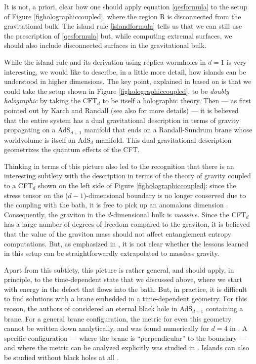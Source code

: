 \documentclass[12pt]{article}
\begin{document}
It is not, a priori, clear how one should apply equation \eqref{qesformula} to the setup of Figure \ref{figholographiccoupled}, where the region R is disconnected from the gravitational bulk. The island rule \eqref{islandformula} tells us that we can still use the prescription of \eqref{qesformula} but, while computing extremal surfaces,  we should also include disconnected surfaces in the gravitational bulk.





While the island rule and its derivation using replica wormholes in $d = 1$ is very interesting, we would like to describe, in a little more detail, how islands can be understood in higher dimensions. The key point, explained in \cite{Almheiri:2019hni} based on \cite{Almheiri:2019psf} is that we could take  the  setup shown in Figure \ref{figholographiccoupled}, to be {\em doubly holographic} by taking the $\text{CFT}_{d}$ to be itself a holographic theory. Then --- as first pointed out by Karch and Randall \cite{Karch:2000ct,Karch:2000gx} (see also \cite{Aharony:2003qf,Takayanagi:2011zk} for more details) --- it is believed that the entire system  has a dual gravitational description in terms of gravity propagating on a AdS$_{d+1}$ manifold that ends on a  Randall-Sundrum brane \cite{Randall:1999ee,Randall:1999vf} whose worldvolume is itself an AdS$_d$ manifold. This dual gravitational description geometrizes the quantum effects of the CFT.

Thinking in terms of this picture also led to the recognition \cite{Geng:2020qvw} that there is an interesting subtlety with the description in terms of the theory of gravity coupled to a CFT$_d$ shown on the left side of Figure \ref{figholographiccoupled}: since the stress tensor on the ($d-1$)-dimensional boundary is no longer conserved due to the coupling with the bath, it is free to pick up an anomalous dimension \cite{Aharony:2006hz}. Consequently, the graviton in the $d$-dimensional bulk is {\em massive}. Since the CFT$_d$ has a large number of degrees of freedom compared to the graviton, it is believed that the value of the graviton mass should not affect entanglement entropy computations. But, as emphasized in \cite{Geng:2020qvw}, it is not clear whether the lessons learned in this setup can be straightforwardly extrapolated to massless gravity.

Apart from this subtlety, this picture is rather general, and should apply, in principle,  to the time-dependent state that we discussed above, where we start with energy in the defect that flows into the bath. But, in practice,  it is difficult to find solutions with a brane embedded in a time-dependent geometry.  For this reason, the authors of  \cite{Almheiri:2019psy}  considered an eternal black hole in AdS$_{d+1}$ containing a brane. For a general brane configuration,  the metric for even this geometry cannot be written down analytically, and was found numerically for $d = 4$ in \cite{Almheiri:2019psy}. A specific configuration ---  where the brane is ``perpendicular'' to the boundary --- and where the metric can be analyzed explicitly was studied in \cite{Geng:2020qvw}.
  Islands can also be studied without black holes at all \cite{Chen:2020uac}.
\end{document}
